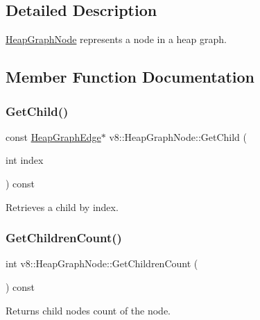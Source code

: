 \subsection{Detailed Description}
\mbox{\hyperlink{classv8_1_1HeapGraphNode}{Heap\+Graph\+Node}} represents a node in a heap graph. 

\subsection{Member Function Documentation}
\mbox{\label{classv8_1_1HeapGraphNode_a3dc91726c26eb1c167706b112cd74564}} 
\subsubsection{\texorpdfstring{Get\+Child()}{GetChild()}}
{\footnotesize\ttfamily const \mbox{\hyperlink{classv8_1_1HeapGraphEdge}{Heap\+Graph\+Edge}}$\ast$ v8\+::\+Heap\+Graph\+Node\+::\+Get\+Child (\begin{DoxyParamCaption}\item[{int}]{index }\end{DoxyParamCaption}) const}

Retrieves a child by index. \mbox{\label{classv8_1_1HeapGraphNode_afb0afb27e5d5ae27b54376bc69f095ae}} 
\subsubsection{\texorpdfstring{Get\+Children\+Count()}{GetChildrenCount()}}
{\footnotesize\ttfamily int v8\+::\+Heap\+Graph\+Node\+::\+Get\+Children\+Count (\begin{DoxyParamCaption}{ }\end{DoxyParamCaption}) const}

Returns child nodes count of the node. \mbox{\label{classv8_1_1HeapGraphNode_a62cd677be9c23067c6e2394b1fd154c6}} 
